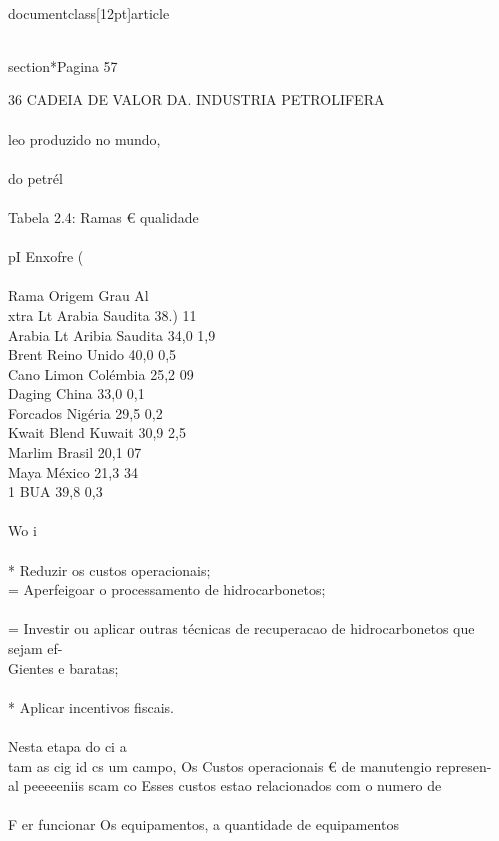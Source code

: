 \\documentclass[12pt]{article}
\begin{document}
\\section*{Pagina 57}

36 CADEIA DE VALOR DA. INDUSTRIA PETROLIFERA\\
\\
leo produzido no mundo,\\
\\
do petrél\\
\\
Tabela 2.4: Ramas € qualidade\\
\\
pI Enxofre (\\%
\\
Rama Origem Grau Al\\
xtra Lt Arabia Saudita 38.) 11\\
Arabia Lt Aribia Saudita 34,0 1,9\\
Brent Reino Unido 40,0 0,5\\
Cano Limon Colémbia 25,2 09\\
Daging China 33,0 0,1\\
Forcados Nigéria 29,5 0,2\\
Kwait Blend Kuwait 30,9 2,5\\
Marlim Brasil 20,1 07\\
Maya México 21,3 34\\
1 BUA 39,8 0,3\\
\\
Wo i\\
\\
* Reduzir os custos operacionais;\\
= Aperfeigoar o processamento de hidrocarbonetos;\\
\\
= Investir ou aplicar outras técnicas de recuperacao de hidrocarbonetos que sejam ef-\\
Gientes e baratas;\\
\\
* Aplicar incentivos fiscais.\\
\\
Nesta etapa do ci a\\
tam as cig id cs um campo, Os Custos operacionais € de manutengio represen-\\
al peeeeeniis scam co Esses custos estao relacionados com o numero de\\
\\
F er funcionar Os equipamentos, a quantidade de equipamentos\\
\\
\end{document}
